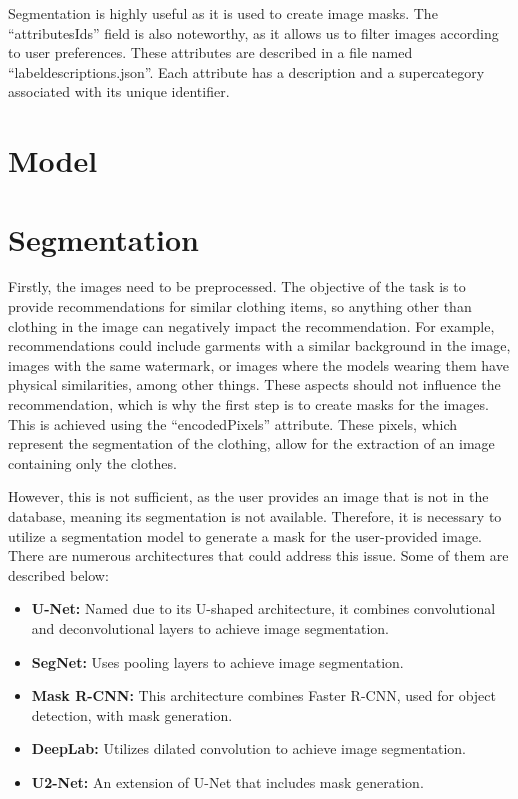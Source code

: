 \documentclass[12pt]{report} %
\begin{document}
Segmentation is highly useful as it is used to create image masks. The ``attributesIds'' field is also noteworthy, as it allows us to filter images according to user preferences. These attributes are described in a file named ``label\textunderscore descriptions.json''. Each attribute has a description and a supercategory associated with its unique identifier.

\section*{Model}
\section*{Segmentation}
Firstly, the images need to be preprocessed. The objective of the task is to provide recommendations for similar clothing items, so anything other than clothing in the image can negatively impact the recommendation. For example, recommendations could include garments with a similar background in the image, images with the same watermark, or images where the models wearing them have physical similarities, among other things. These aspects should not influence the recommendation, which is why the first step is to create masks for the images. This is achieved using the ``encodedPixels'' attribute. These pixels, which represent the segmentation of the clothing, allow for the extraction of an image containing only the clothes.

However, this is not sufficient, as the user provides an image that is not in the database, meaning its segmentation is not available. Therefore, it is necessary to utilize a segmentation model to generate a mask for the user-provided image. There are numerous architectures that could address this issue. Some of them are described below:

\begin{itemize}
	\item \textbf{U-Net:} Named due to its U-shaped architecture, it combines convolutional and deconvolutional layers to achieve image segmentation.
	\item \textbf{SegNet:} Uses pooling layers to achieve image segmentation.
	\item \textbf{Mask R-CNN:} This architecture combines Faster R-CNN, used for object detection, with mask generation.
	\item \textbf{DeepLab:} Utilizes dilated convolution to achieve image segmentation.
	\item \textbf{U2-Net:} An extension of U-Net that includes mask generation.
\end{itemize}
\end{document}
